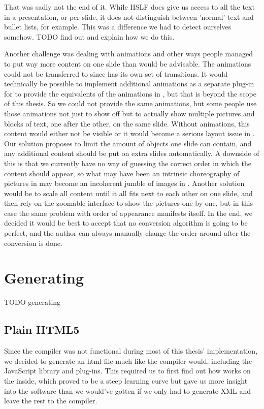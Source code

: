    That was sadly not the end of it. While HSLF does give us access to all the
   text in a presentation, or per slide, it does not distinguish between
   'normal' text and bullet lists, for example. This was a difference we had to
   detect ourselves somehow. TODO find out and explain how we do this.

   Another challenge was dealing with animations and other ways people managed
   to put way more content on one slide than would be advisable. The animations
   could not be transferred to \mxp since \mxp has its own set of transitions.
   It would technically be possible to implement additional animations as a
   separate plug-in for \mxp to provide the equivalents of the animations in
   \ppt*, but that is beyond the scope of this thesis. So we could not provide
   the same animations, but some people use those animations not just to show
   off but to actually show multiple pictures and blocks of text, one after the
   other, on the same slide. Without animations, this content would either not
   be visible or it would become a serious layout issue in \mxp. Our solution
   proposes to limit the amount of objects one slide can contain, and any
   additional content should be put on extra slides automatically. A downside
   of this is that we currently have no way of guessing the correct order in
   which the content should appear, so what may have been an intrinsic
   choreography of pictures in \ppt may become an incoherent jumble of images
   in \mxp. Another solution would be to scale all content until it all fits
   next to each other on one slide, and then rely on the zoomable interface to
   show the pictures one by one, but in this case the same problem with order
   of appearance manifests itself. In the end, we decided it would be best to
   accept that no conversion algorithm is going to be perfect, and the author
   can always manually change the order around after the conversion is done.

  \section{Generating \mxp}

   TODO generating

   \subsection{Plain HTML5}

    Since the \mxp compiler was not functional during most of this thesis'
    implementation, we decided to generate an html file much like the \mxp
    compiler would, including the \mxp JavaScript library and plug-ins. This
    required us to first find out how \mxp works on the inside, which proved to
    be a steep learning curve but gave us more insight into the software than
    we would've gotten if we only had to generate \mxp XML and leave the rest
    to the compiler.

